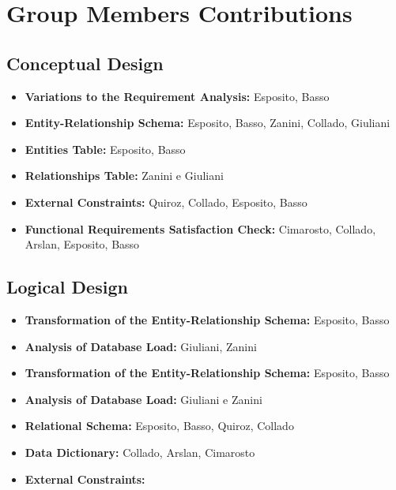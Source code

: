 \section{Group Members Contributions}


\subsection{Conceptual Design}
\begin{itemize}
	\item \textbf{Variations to the Requirement Analysis:} Esposito, Basso
	\item \textbf{Entity-Relationship Schema:} Esposito, Basso, Zanini, Collado, Giuliani 
	\item \textbf{Entities Table:} Esposito, Basso
	\item \textbf{Relationships Table:} Zanini e Giuliani
	\item \textbf{External Constraints:} Quiroz, Collado, Esposito, Basso
	\item \textbf{Functional Requirements Satisfaction Check:} Cimarosto, Collado, Arslan, Esposito, Basso
\end{itemize}

\subsection{Logical Design}
\begin{itemize}
	\item \textbf{Transformation of the Entity-Relationship Schema:} Esposito, Basso 
	\item \textbf{Analysis of Database Load:} Giuliani, Zanini
	\item \textbf{Transformation of the Entity-Relationship Schema:} Esposito, Basso
	\item \textbf{Analysis of Database Load:} Giuliani e Zanini
	\item \textbf{Relational Schema:} Esposito, Basso, Quiroz, Collado
	\item \textbf{Data Dictionary:} Collado, Arslan, Cimarosto
	\item \textbf{External Constraints:}
\end{itemize}	